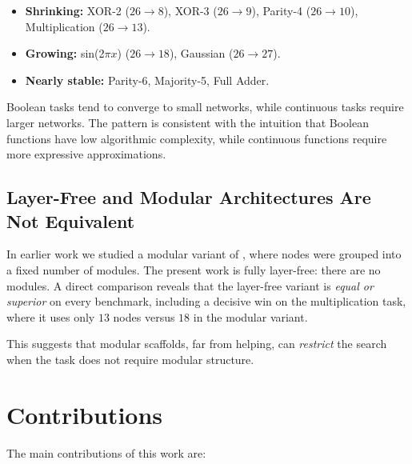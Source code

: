 \begin{itemize}
  \item \textbf{Shrinking:} XOR-2 ($26 \to 8$), XOR-3 ($26 \to 9$),
    Parity-4 ($26 \to 10$), Multiplication ($26 \to 13$).
  \item \textbf{Growing:} sin(2$\pi x$) ($26 \to 18$), Gaussian
    ($26 \to 27$).
  \item \textbf{Nearly stable:} Parity-6, Majority-5, Full Adder.
\end{itemize}

Boolean tasks tend to converge to small networks, while continuous tasks
require larger networks. The pattern is consistent with the intuition that
Boolean functions have low algorithmic complexity, while continuous
functions require more expressive approximations.

\subsection{Layer-Free and Modular Architectures Are Not Equivalent}

In earlier work we studied a modular variant of \modnet{}, where nodes
were grouped into a fixed number of modules. The present work is fully
layer-free: there are no modules. A direct comparison reveals that the
layer-free variant is \emph{equal or superior} on every benchmark,
including a decisive win on the multiplication task, where it uses only
$13$ nodes versus $18$ in the modular variant.

This suggests that modular scaffolds, far from helping, can \emph{restrict}
the search when the task does not require modular structure.

\section{Contributions}

The main contributions of this work are:

